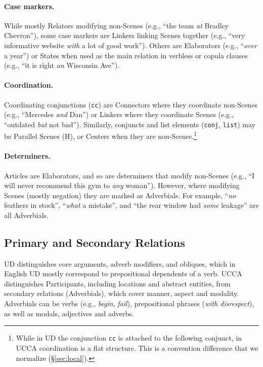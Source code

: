 \documentclass[11pt,a4paper,table]{article}
\begin{document}
\paragraph{Case markers.}
      While mostly Relators
      modifying non-Scenes (e.g., ``the team \textit{at} Bradley Chevron''),
      some case markers are Linkers linking Scenes together 
      (e.g., ``very informative website \textit{with} a lot of good work'').
      Others are Elaborators (e.g., ``\textit{over} a year'') or States
      when used as the main relation in verbless or copula clauses
      (e.g., ``it is right \textit{on} Wisconsin Ave'').
    
\paragraph{Coordination.}
      Coordinating conjunctions (\texttt{cc}) are Connectors where they coordinate non-Scenes
      (e.g., ``Mercedes \textit{and} Dan'')
      or Linkers where they coordinate Scenes (e.g., ``outdated \textit{but} not bad'').
      Similarly, conjuncts and list elements (\texttt{conj}, \texttt{list}) may be Parallel Scenes (H),
      or Centers when they are non-Scenes.\footnote{While in UD 
      the conjunction \texttt{cc} is attached to the following conjunct,
      in UCCA coordination is a flat structure.
      This is a convention difference that we normalize (\S\ref{sec:local}).}

\paragraph{Determiners.}
      Articles are Elaborators, and so are determiners that modify non-Scenes 
      (e.g., ``I will never recommend this gym to \textit{any} woman'').
      However, where modifying Scenes (mostly negation)
      they are marked as Adverbials. For example, ``\textit{no} feathers in stock'', ``\textit{what} a mistake'',
      and ``the rear window had \textit{some} leakage'' are all Adverbials.



\subsection{Primary and Secondary Relations}\label{sec:arguments}

UD distinguishes core arguments, adverb modifiers,
and obliques, which in English UD mostly correspond to prepositional dependents of a verb.
UCCA distinguishes Participants, including locations and abstract entities,
from secondary relations (Adverbials), 
which cover manner, aspect and modality.
Adverbials can be verbs (e.g., \textit{begin}, \textit{fail}),
prepositional phrases (\textit{with disrespect}),
as well as modals, adjectives and adverbs.
\end{document}
